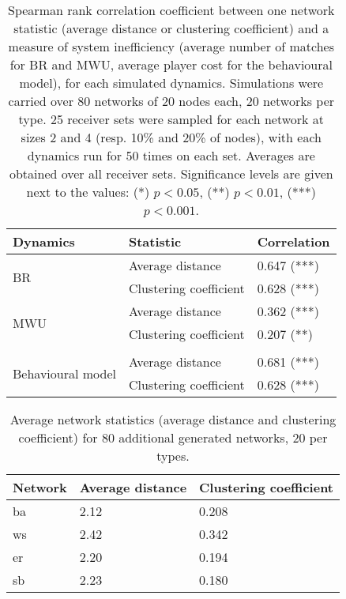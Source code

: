 \begin{table}\centering
  \caption{Spearman rank correlation coefficient between one network statistic (average distance or clustering coefficient) and a measure of system inefficiency (average number of matches for BR and MWU, average player cost for the behavioural model), for each simulated dynamics.
  Simulations were carried over 80 networks of 20 nodes each, 20 networks per type. 25 receiver sets were sampled for each network at sizes 2 and 4 (resp. 10\% and 20\% of nodes), with each dynamics run for 50 times on each set. Averages are obtained over all receiver sets.
  Significance levels are given next to the values: (*) \( p < 0.05 \), (**) \( p < 0.01 \), (***) \( p< 0.001 \).}
  \label{tab:col/gennetcor}
  \begin{tabular}{l|l|l}
  \toprule
  Dynamics & Statistic & Correlation \\
  \midrule
  \multirow{2}{*}{BR} & Average distance & 0.647 (***) \\
    & Clustering coefficient & 0.628 (***) \\
  \midrule
  \multirow{2}{*}{MWU} & Average distance & 0.362 (***) \\
    & Clustering coefficient & 0.207 (**) \\
  \midrule
  & & \\
  \midrule
  \multirow{2}{*}{Behavioural model} & Average distance & 0.681 (***) \\
    & Clustering coefficient & 0.628 (***) \\
  \bottomrule
  \end{tabular}
\end{table}

\begin{table}\centering
  \caption{Average network statistics (average distance and clustering coefficient) for 80 additional generated networks, 20 per types.}
  \label{tab:col/gennetstat}
  \begin{tabular}{l|l|l}
  \toprule
  Network & Average distance & Clustering coefficient \\
  \midrule
  ba & 2.12 & 0.208 \\
  \midrule
  ws & 2.42 & 0.342 \\
  \midrule
  er & 2.20 & 0.194 \\
  \midrule
  sb & 2.23 & 0.180 \\
  \bottomrule
  \end{tabular}
\end{table}
